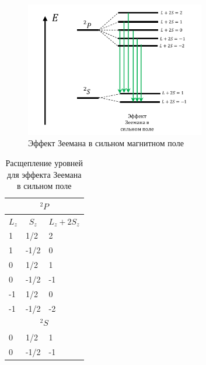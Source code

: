 \documentclass[12pt]{article}
\begin{document}
\begin{figure}[h!]
    \centering
    \includegraphics[width=0.7\textwidth,height=\textheight,keepaspectratio]{Seminar_08/pics/pic_04.pdf}
    \caption{Эффект Зеемана в сильном магнитном поле}
    \label{fig:sem_08_strong_zeeman}
\end{figure}


\begin{table}[h!]
\centering
\begin{tabular}{|l|l|l|}
\hline
\multicolumn{3}{|c|}{${}^2P$}                                                                 \\ \hline
\multicolumn{1}{|c|}{$L_z$} & \multicolumn{1}{c|}{$S_z$} & \multicolumn{1}{c|}{$L_z+2S_z$} \\ \hline
1                          & 1/2                       & 2                               \\ \hline
1                          & -1/2                      & 0                               \\ \hline
0                          & 1/2                       & 1                               \\ \hline
0                          & -1/2                      & -1                              \\ \hline
-1                         & 1/2                       & 0                               \\ \hline
-1                         & -1/2                      & -2                              \\ \hline
\multicolumn{3}{|c|}{${}^2S$}                                                                 \\ \hline
0                          & 1/2                       & 1                               \\ \hline
0                          & -1/2                      & -1                              \\ \hline
\end{tabular}
\caption{Расщепление уровней для эффекта Зеемана в сильном поле}
\end{table}
\end{document}
